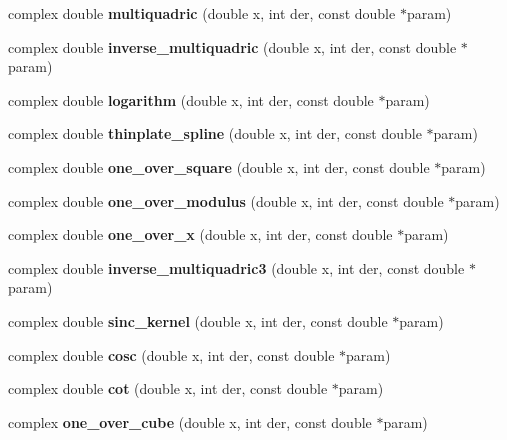 \begin{CompactItemize}
\item 
\hypertarget{group__applications__fastsum_ga19}{
complex double {\bf multiquadric} (double x, int der, const double $\ast$param)}
\label{group__applications__fastsum_ga19}

\item 
\hypertarget{group__applications__fastsum_ga20}{
complex double {\bf inverse\_\-multiquadric} (double x, int der, const double $\ast$param)}
\label{group__applications__fastsum_ga20}

\item 
\hypertarget{group__applications__fastsum_ga21}{
complex double {\bf logarithm} (double x, int der, const double $\ast$param)}
\label{group__applications__fastsum_ga21}

\item 
\hypertarget{group__applications__fastsum_ga22}{
complex double {\bf thinplate\_\-spline} (double x, int der, const double $\ast$param)}
\label{group__applications__fastsum_ga22}

\item 
\hypertarget{group__applications__fastsum_ga23}{
complex double {\bf one\_\-over\_\-square} (double x, int der, const double $\ast$param)}
\label{group__applications__fastsum_ga23}

\item 
\hypertarget{group__applications__fastsum_ga24}{
complex double {\bf one\_\-over\_\-modulus} (double x, int der, const double $\ast$param)}
\label{group__applications__fastsum_ga24}

\item 
\hypertarget{group__applications__fastsum_ga25}{
complex double {\bf one\_\-over\_\-x} (double x, int der, const double $\ast$param)}
\label{group__applications__fastsum_ga25}

\item 
\hypertarget{group__applications__fastsum_ga26}{
complex double {\bf inverse\_\-multiquadric3} (double x, int der, const double $\ast$param)}
\label{group__applications__fastsum_ga26}

\item 
\hypertarget{group__applications__fastsum_ga27}{
complex double {\bf sinc\_\-kernel} (double x, int der, const double $\ast$param)}
\label{group__applications__fastsum_ga27}

\item 
\hypertarget{group__applications__fastsum_ga28}{
complex double {\bf cosc} (double x, int der, const double $\ast$param)}
\label{group__applications__fastsum_ga28}

\item 
\hypertarget{group__applications__fastsum_ga29}{
complex double {\bf cot} (double x, int der, const double $\ast$param)}
\label{group__applications__fastsum_ga29}

\item 
\hypertarget{group__applications__fastsum_ga30}{
complex {\bf one\_\-over\_\-cube} (double x, int der, const double $\ast$param)}
\label{group__applications__fastsum_ga30}

\end{CompactItemize}


